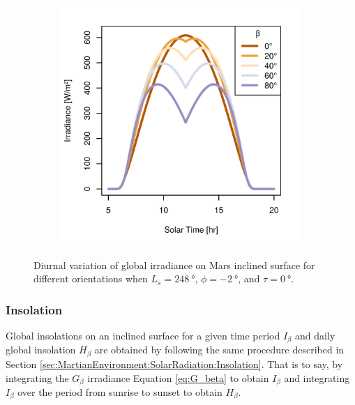 \begin{figure}[h]
\begin{subfigure}[t]{\subfigureWidth}
  		\label{fig:sub:irradiance-inclined-gamma-c-m180}
  	\end{subfigure}\hfill
	   \begin{subfigure}[t]{\subfigureWidth}
      \centering
  		\includegraphics[height=\graphicsHeight]{sections/martian-environment/plots/gi-variation-4-for-ls-248-phi-2-tau-05-gammac-90-and-albedo-027.png}
  		\label{fig:sub:irradiance-inclined-gamma-c-90}
	   \end{subfigure}\hfill
	\caption{Diurnal variation of global irradiance on Mars inclined surface for different orientations when $L_{s} = \SI{248}{\degree}$, $\phi = \SI{-2}{\degree}$, and $\tau = \SI{0}{\degree}$.}
	\label{fig:plot:irradiance-inclined-gamma-c}
\vspace{-2ex}
\end{figure}

\clearpage
\subsubsection{Insolation}
\label{sec:MartianEnvironment:SolarRadiation:InclinedSurface:Insolation}

Global insolations on an inclined surface for a given time period $I_{\beta}$ and daily global insolation $H_{\beta}$ are obtained by following the same procedure described in Section \ref{sec:MartianEnvironment:SolarRadiation:Insolation}. That is to say, by integrating the $G_{\beta}$ irradiance Equation \ref{eq:G_beta} to obtain $I_{\beta}$ and integrating $I_{\beta}$ over the period from sunrise to sunset to obtain $H_{\beta}$.

